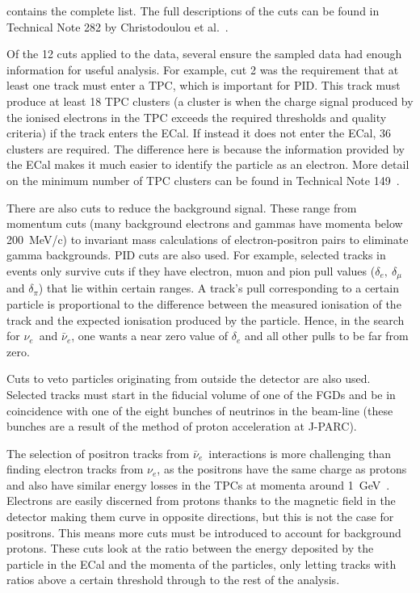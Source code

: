 \documentclass[aps,pra,12pt,notitlepage,tightenlines]{revtex4-1}
\newcommand{\nue}{$\nu_e$}
\newcommand{\anue}{$\bar\nu_e$}
\begin{document}
contains the complete list. The full descriptions of the cuts can be found in Technical Note 282 by Christodoulou et al.~\cite{Christodoulou2017}.

Of the 12 cuts applied to the data, several ensure the sampled data had enough information for useful analysis. For example, cut 2 was the requirement that at least one track must enter a TPC, which is important for PID. This track must produce at least 18 TPC clusters (a cluster is when the charge signal produced by the ionised electrons in the TPC exceeds the required thresholds and quality criteria) if the track enters the ECal. If instead it does not enter the ECal, 36 clusters are required. The difference here is because the information provided by the ECal makes it much easier to identify the particle as an electron. More detail on the minimum number of TPC clusters can be found in Technical Note 149~\cite{Giganti2013}.

There are also cuts to reduce the background signal. These range from momentum cuts (many background electrons and gammas have momenta below 200~MeV/c) to invariant mass calculations of electron-positron pairs to eliminate gamma backgrounds. PID cuts are also used. For example, selected tracks in events only survive cuts if they have electron, muon and pion pull values ($\delta_e, \ \delta_\mu$ and $\delta_\pi$) that lie within certain ranges. A track's pull corresponding to a certain particle is proportional to the difference between the measured ionisation of the track and the expected ionisation produced by the particle. Hence, in the search for \nue \ and \anue, one wants a near zero value of $\delta_e$ and all other pulls to be far from zero.

Cuts to veto particles originating from outside the detector are also used. Selected tracks must start in the fiducial volume of one of the FGDs and be in coincidence with one of the eight bunches of neutrinos in the beam-line (these bunches are a result of the method of proton acceleration at J-PARC).

The selection of positron tracks from \anue \ interactions is more challenging than finding electron tracks from \nue, as the positrons have the same charge as protons and also have similar energy losses in the TPCs at momenta around 1~GeV~\cite{Giganti2013}. Electrons are easily discerned from protons thanks to the magnetic field in the detector making them curve in opposite directions, but this is not the case for positrons. This means more cuts must be introduced to account for background protons. These cuts look at the ratio between the energy deposited by the particle in the ECal and the momenta of the particles, only letting tracks with ratios above a certain threshold through to the rest of the analysis.
\end{document}
